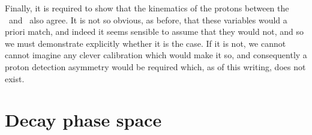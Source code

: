 Finally, it is required to show that the kinematics of the protons between the 
\pKK\ and \ppipi\ also agree.
It is not so obvious, as before, that these variables would a priori match, and 
indeed it seems sensible to assume that they would not, and so we must 
demonstrate explicitly whether it is the case.
If it is not, we cannot cannot imagine any clever calibration which would make 
it so, and consequently a proton detection asymmetry would be required which, 
as of this writing, does not exist.\footnotemark


\section{Decay phase space}
\label{chap:cpv:theory:phsp}

